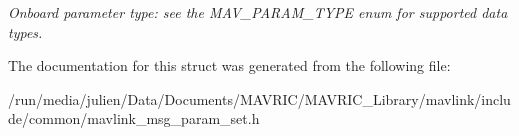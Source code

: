 \begin{DoxyCompactItemize}
\begin{DoxyCompactList}\small\item\em Onboard parameter type\+: see the M\+A\+V\+\_\+\+P\+A\+R\+A\+M\+\_\+\+T\+Y\+P\+E enum for supported data types. \end{DoxyCompactList}\end{DoxyCompactItemize}


The documentation for this struct was generated from the following file\+:\begin{DoxyCompactItemize}
\item 
/run/media/julien/\+Data/\+Documents/\+M\+A\+V\+R\+I\+C/\+M\+A\+V\+R\+I\+C\+\_\+\+Library/mavlink/include/common/mavlink\+\_\+msg\+\_\+param\+\_\+set.\+h\end{DoxyCompactItemize}
